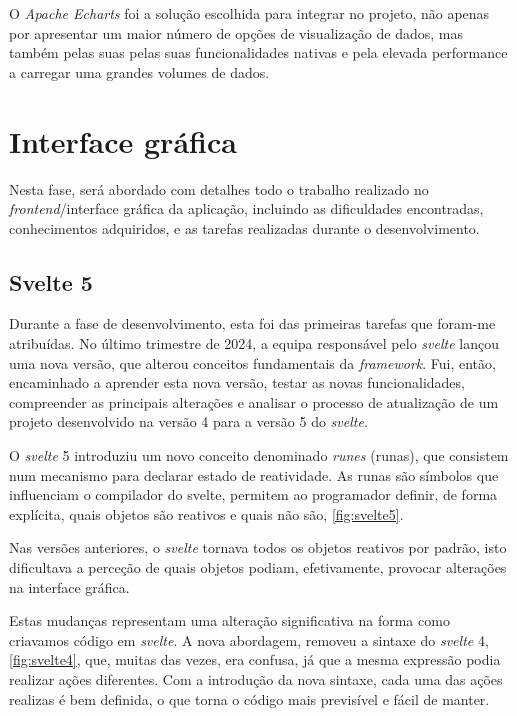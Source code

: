 O \textit{Apache Echarts} foi a solução escolhida para integrar no projeto, não apenas por apresentar um maior número de opções de visualização de dados, mas também pelas suas pelas suas funcionalidades nativas e pela elevada performance a carregar uma grandes volumes de dados. 

\clearpage
\section{Interface gráfica}\label{sec:frontend}
Nesta fase, será abordado com detalhes todo o trabalho realizado no \textit{frontend}/interface gráfica da aplicação, incluindo as dificuldades encontradas, conhecimentos adquiridos, e as tarefas realizadas durante o desenvolvimento.  

\subsection{Svelte 5}\label{sec:svelte5}
Durante a fase de desenvolvimento, esta foi das primeiras tarefas que foram-me atribuídas. No último trimestre de 2024, a equipa responsável pelo \textit{svelte} lançou uma nova versão, que alterou conceitos fundamentais da \textit{framework}. Fui, então, encaminhado a aprender esta nova versão, testar as novas funcionalidades, compreender as principais alterações e analisar o processo de atualização de um projeto desenvolvido na versão 4 para a versão 5 do \textit{svelte}.  

O \textit{svelte} 5 introduziu um novo conceito denominado \textit{runes} (runas), que consistem num mecanismo para declarar estado de reatividade. As runas são símbolos que influenciam o compilador do svelte, permitem ao programador definir, de forma explícita, quais objetos são reativos e quais não são, \autoref{fig:svelte5}. 

Nas versões anteriores, o \textit{svelte} tornava todos os objetos reativos por padrão, isto dificultava a perceção de quais objetos podiam, efetivamente, provocar alterações na interface gráfica.

Estas mudanças representam uma alteração significativa na forma como criavamos código em \textit{svelte}. A nova abordagem, removeu a sintaxe do \textit{svelte} 4, \autoref{fig:svelte4}, que, muitas das vezes, era confusa, já que a mesma expressão podia realizar ações diferentes. Com a introdução da nova sintaxe, cada uma das ações realizas é bem definida, o que torna o código mais previsível e fácil de manter. 

